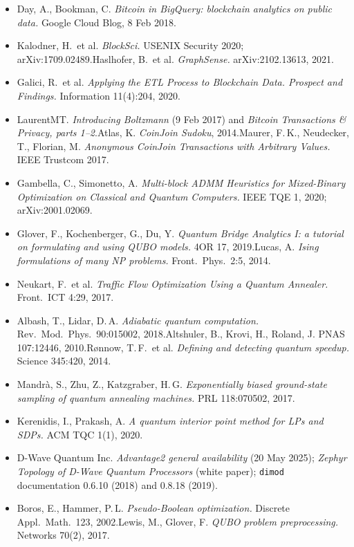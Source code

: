 \documentclass[10pt,a4paper]{article}
\begin{document}
\begin{itemize}[leftmargin=1.2em,itemsep=1pt]
  \item Day, A., Bookman, C. \emph{Bitcoin in BigQuery: blockchain analytics on public data.} Google Cloud Blog, 8 Feb 2018.
  \item Kalodner, H.\ et al. \emph{BlockSci.} USENIX Security 2020; arXiv:1709.02489.\quad Haslhofer, B.\ et al. \emph{GraphSense.} arXiv:2102.13613, 2021.
  \item Galici, R.\ et al. \emph{Applying the ETL Process to Blockchain Data. Prospect and Findings.} Information 11(4):204, 2020.
  \item LaurentMT. \emph{Introducing Boltzmann} (9 Feb 2017) and \emph{Bitcoin Transactions \& Privacy, parts 1--2}.\quad Atlas, K. \emph{CoinJoin Sudoku}, 2014.\quad Maurer, F.\,K., Neudecker, T., Florian, M. \emph{Anonymous CoinJoin Transactions with Arbitrary Values.} IEEE Trustcom 2017.
  \item Gambella, C., Simonetto, A. \emph{Multi-block ADMM Heuristics for Mixed-Binary Optimization on Classical and Quantum Computers.} IEEE TQE 1, 2020; arXiv:2001.02069.
  \item Glover, F., Kochenberger, G., Du, Y. \emph{Quantum Bridge Analytics I: a tutorial on formulating and using QUBO models.} 4OR 17, 2019.\quad Lucas, A. \emph{Ising formulations of many NP problems.} Front.\ Phys.\ 2:5, 2014.
  \item Neukart, F.\ et al. \emph{Traffic Flow Optimization Using a Quantum Annealer.} Front.\ ICT 4:29, 2017.
  \item Albash, T., Lidar, D.\,A. \emph{Adiabatic quantum computation.} Rev.\ Mod.\ Phys.\ 90:015002, 2018.\quad Altshuler, B., Krovi, H., Roland, J. PNAS 107:12446, 2010.\quad R{\o}nnow, T.\,F.\ et al. \emph{Defining and detecting quantum speedup.} Science 345:420, 2014.
  \item Mandr\`a, S., Zhu, Z., Katzgraber, H.\,G. \emph{Exponentially biased ground-state sampling of quantum annealing machines.} PRL 118:070502, 2017.
  \item Kerenidis, I., Prakash, A. \emph{A quantum interior point method for LPs and SDPs.} ACM TQC 1(1), 2020.
  \item D-Wave Quantum Inc. \emph{Advantage2 general availability} (20 May 2025); \emph{Zephyr Topology of D-Wave Quantum Processors} (white paper); \texttt{dimod} documentation 0.6.10 (2018) and 0.8.18 (2019).
  \item Boros, E., Hammer, P.\,L. \emph{Pseudo-Boolean optimization.} Discrete Appl.\ Math.\ 123, 2002.\quad Lewis, M., Glover, F. \emph{QUBO problem preprocessing.} Networks 70(2), 2017.

\end{itemize}
\end{document}

